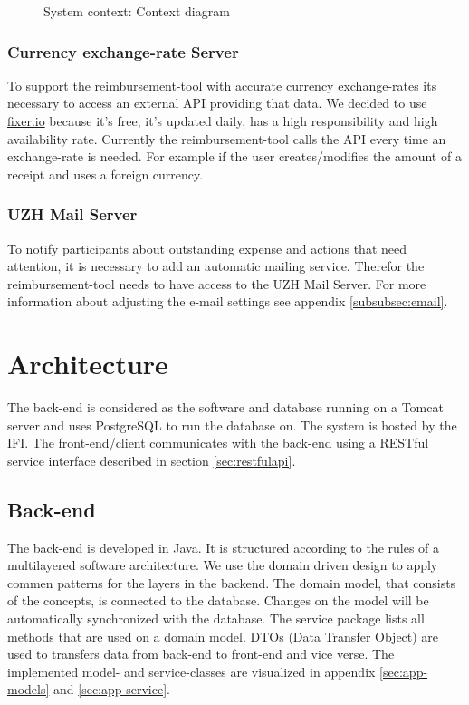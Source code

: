 \begin{figure}[H]
    \centering
    \caption{System context: Context diagram}
    \label{fig:context-diagram}
\end{figure}

\subsubsection{Currency exchange-rate Server}

To support the reimbursement-tool with accurate currency exchange-rates its necessary to access an external API providing that data. We decided to use \url{fixer.io} \cite{fixer} because it's free, it's updated daily, has a high responsibility and high availability rate. Currently the reimbursement-tool calls the API every time an exchange-rate is needed. For example if the user creates/modifies the amount of a receipt and uses a foreign currency.

\subsubsection{UZH Mail Server}
To notify participants about outstanding expense and actions that need attention, it is necessary to add an automatic mailing service. Therefor the reimbursement-tool needs to have access to the UZH Mail Server. For more information about adjusting the e-mail settings see appendix \ref{subsubsec:email}.\newpage


\section{Architecture}

The back-end is considered as the software and database running on a Tomcat \cite{tomcat} server and uses PostgreSQL \cite{postgresql} to run the database on. The system is hosted by the IFI. The front-end/client communicates with the back-end using a RESTful service interface described in section \ref{sec:restfulapi}.

\subsection{Back-end}
The back-end is developed in Java. It is structured according to the rules of a multilayered software architecture. We use the domain driven design \cite{ddd} to apply commen patterns for the layers in the backend. The domain model, that consists of the concepts, is connected to the database. Changes on the model will be automatically synchronized with the database. The service package lists all methods that are used on a domain model.\newline
DTOs (Data Transfer Object) are used to transfers data from back-end to front-end and vice verse. \newline The implemented model- and service-classes are visualized in appendix \ref{sec:app-models} and \ref{sec:app-service}. \par

